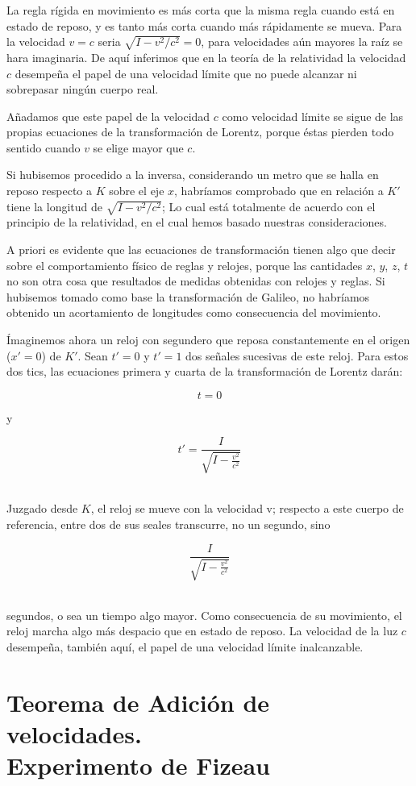 \documentclass[spanish]{book}
\begin{document}
La regla rígida en movimiento es más corta que la misma regla cuando está en estado de reposo, y es
tanto más corta cuando más rápidamente se mueva. Para la velocidad $v=c$ 
seria $\sqrt{I-v^{2}/c^{2}}=0$, para velocidades aún mayores la raíz se hara imaginaria. De aquí
inferimos que en la teoría de la relatividad la velocidad $c$ desempeña
el papel de una velocidad límite que no puede alcanzar ni sobrepasar
ningún cuerpo real.

Añadamos que este papel de la velocidad $c$ como velocidad límite se sigue de las
propias ecuaciones de la transformación de Lorentz, porque éstas pierden todo sentido
cuando $v$ se elige mayor que $c$.

Si hubisemos procedido a la inversa, considerando un metro que se halla en reposo
respecto a $K$ sobre el eje $x$, habríamos comprobado que en relación a $K'$ tiene la
longitud de $\sqrt{I-v^{2}/c^{2}}$; Lo cual está totalmente de acuerdo con el principio de la relatividad, en el cual hemos
basado nuestras consideraciones.

A priori es evidente que las ecuaciones de transformación tienen algo que decir
sobre el comportamiento físico de reglas y relojes, porque las cantidades $x$, $y$, $z$, $t$ no son
otra cosa que resultados de medidas obtenidas con relojes y reglas. Si hubisemos
tomado como base la transformación de Galileo, no habríamos obtenido un
acortamiento de longitudes como consecuencia del movimiento.

Ímaginemos ahora un reloj con segundero que reposa constantemente en el origen
($x'=0$) de $K'$. Sean $t'=0$ y $t'=1$  dos señales sucesivas de este reloj. Para estos dos tics,
las ecuaciones primera y cuarta de la transformación de Lorentz darán:

\[t=0\]

\noindent y

\[t'=\frac{I}{\sqrt{I-\frac{v^{2}}{c^{2}}}}\]
 ~

Juzgado desde $K$, el reloj se mueve con la velocidad v; respecto a este cuerpo
de referencia, entre dos de sus seales transcurre, no un segundo, sino

\[\frac{I}{\sqrt{I-\frac{v^{2}}{c^{2}}}}\]
 ~

\noindent segundos, o sea un tiempo algo mayor.
Como consecuencia de su movimiento, el reloj marcha algo más despacio que en estado
de reposo. La velocidad de la luz $c$ desempeña, también aquí, el papel de una
velocidad límite inalcanzable.


\chapter{Teorema de Adición de velocidades. \protect \protect \\
Experimento de Fizeau}
\end{document}
